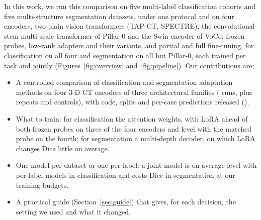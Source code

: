In this work, we run this comparison on five multi-label classification cohorts and five multi-structure segmentation datasets, under one protocol and on four encoders, two plain vision transformers (TAP-CT, SPECTRE), the convolutional-stem multi-scale transformer of Pillar-0 and the Swin encoder of VoCo: frozen probes, low-rank adapters and their variants, and partial and full fine-tuning, for classification on all four and segmentation on all but Pillar-0, each trained per task and jointly (Figures~\ref{fig:overview} and~\ref{fig:pipeline}). Our contributions are:
\begin{itemize}\setlength{\itemsep}{1pt}
  \item A controlled comparison of \numClsMethodsN{} classification and \numSegMethodsN{} segmentation adaptation methods on four 3-D CT encoders of three architectural families (\numRunsMainN{} runs, plus \numRunsRevisionN{} repeats and controls), with code, splits and per-case predictions released ().
  \item What to train: for classification the attention weights, with LoRA ahead of both frozen probes on three of the four encoders and level with the matched probe on the fourth; for segmentation a multi-depth decoder, on which LoRA changes Dice little on average.
  \item One model per dataset or one per label: a joint model is on average level with per-label models in classification and costs Dice in segmentation at our training budgets.
  \item A practical guide (Section~\ref{sec:guide}) that gives, for each decision, the setting we used and what it changed.
\end{itemize}
